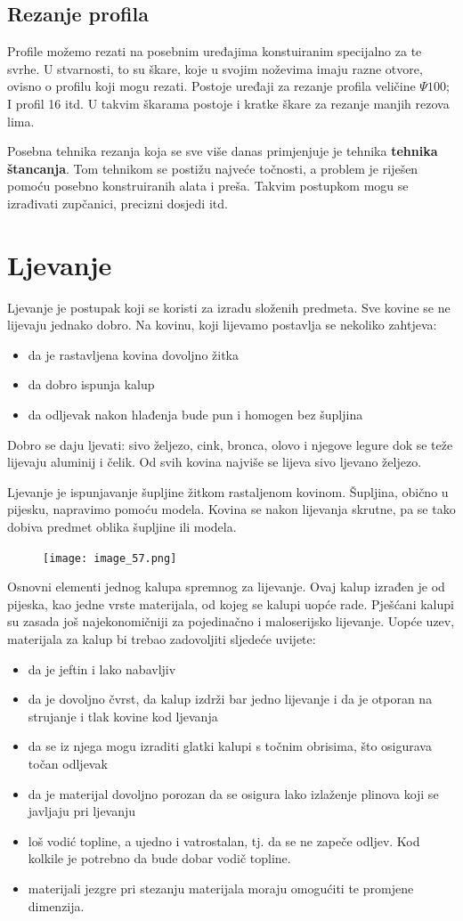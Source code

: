 \documentclass[a4paper,12pt]{article}
\numberwithin{figure}{section}
\begin{document}
\subsection{Rezanje profila}
Profile možemo rezati na posebnim uređajima konstuiranim specijalno za te svrhe. U stvarnosti, to su škare, koje u svojim noževima imaju razne otvore, ovisno o profilu koji mogu rezati. Postoje uređaji za rezanje profila veličine $\Psi 100$; I profil 16 itd. U takvim škarama postoje i kratke škare za rezanje manjih rezova lima.\par
Posebna tehnika rezanja koja se sve više danas primjenjuje je tehnika \textbf{tehnika štancanja}. Tom tehnikom se postižu najveće točnosti, a problem je riješen pomoću posebno konstruiranih alata i preša. Takvim postupkom mogu se izrađivati zupčanici, precizni dosjedi itd.
\section{Ljevanje}
Ljevanje je postupak koji se koristi za izradu složenih predmeta. Sve kovine se ne lijevaju jednako dobro. Na kovinu, koji lijevamo postavlja se nekoliko zahtjeva:
\begin{itemize}
\item da je rastavljena kovina dovoljno žitka
\item da dobro ispunja kalup
\item da odljevak nakon hlađenja bude pun i homogen bez šupljina
\end{itemize}
Dobro se daju ljevati: sivo željezo, cink, bronca, olovo i njegove legure dok se teže lijevaju aluminij i čelik. Od svih kovina najviše se lijeva sivo ljevano željezo. \par
Ljevanje je ispunjavanje šupljine žitkom rastaljenom kovinom. Šupljina, obično u pijesku, napravimo pomoću modela. Kovina se nakon lijevanja skrutne, pa se tako dobiva predmet oblika šupljine ili modela.
\begin{figure}[!h]
\centering
\texttt{[image: image\_57.png]}
\end{figure}
\FloatBarrier
Osnovni elementi jednog kalupa spremnog za lijevanje. Ovaj kalup izrađen je od pijeska, kao jedne vrste materijala, od kojeg se kalupi uopće rade. Pješćani kalupi su zasada još najekonomičniji za pojedinačno i maloserijsko lijevanje. Uopće uzev, materijala za kalup bi trebao zadovoljiti sljedeće uvijete:
\begin{itemize}
\item da je jeftin i lako nabavljiv
\item da je dovoljno čvrst, da kalup izdrži bar jedno lijevanje i da je otporan na strujanje i tlak kovine kod ljevanja
\item da se iz njega mogu izraditi glatki kalupi s točnim obrisima, što osigurava točan odljevak
\item da je materijal dovoljno porozan da se osigura lako izlaženje plinova koji se javljaju pri ljevanju
\item loš vodić topline, a ujedno i vatrostalan, tj. da se ne zapeče odljev. Kod kolkile je potrebno da bude dobar vodič topline.
\item materijali jezgre pri stezanju materijala moraju omogućiti te promjene dimenzija. 
\end{itemize}
\end{document}
